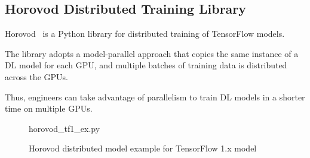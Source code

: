 \subsection{Horovod Distributed Training Library}

Horovod~\cite{sergeev2018horovod} is a Python library for distributed training 
of TensorFlow models. 
\begin{inred}
The library adopts a model-parallel approach that copies the same instance of
a DL model for each GPU, and multiple batches of training data is distributed
across the GPUs.
\end{inred}
Thus, engineers can take advantage of parallelism to train DL models in a
shorter time on multiple GPUs.

\begin{figure}[ht!]
 
{horovod_tf1_ex.py}
  \caption{Horovod distributed model example for TensorFlow 1.x model}
\label{fig:back:hvd1} 
\end{figure}

